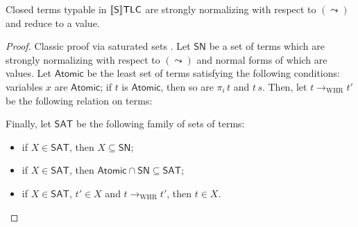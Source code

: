 \begin{theorem}
    Closed terms typable in $\llbracket\mathsf{S}\rrbracket\mathsf{TLC}$ are strongly
    normalizing with respect to $(\leadsto)$ and reduce
    to a value.
\end{theorem}
\begin{proof}
    Classic proof via saturated sets
    \cite{tait1967intensional,girard1989proofs,
    luo1994computation}. Let $\mathsf{SN}$ be a set of
    terms which are strongly normalizing with respect to
    $(\leadsto)$ and normal forms of which are values.
    Let $\mathsf{Atomic}$ be the least set of terms
    satisfying the following conditions: variables $x$
    are $\mathsf{Atomic}$; if $t$ is $\mathsf{Atomic}$,
    then so are $\pi_i\,t$ and $t\,s$. Then, let
    $t\to_\mathrm{WHR}t'$ be the following relation on
    terms:

    Finally, let $\mathsf{SAT}$ be the following family
    of sets of terms:
    \begin{itemize}
        \item if $X\in\mathsf{SAT}$, then
            $X\subseteq\mathsf{SN}$;
        \item if $X\in\mathsf{SAT}$, then
            $\mathsf{Atomic}\cap\mathsf{SN}\subseteq
            \mathsf{SAT}$;
        \item if $X\in\mathsf{SAT}$, $t'\in X$ and
            $t\to_\mathrm{WHR}t'$, then $t\in X$.
    \end{itemize}


\end{proof}
